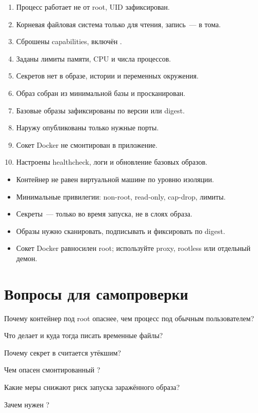 \begin{enumerate}
  \item Процесс работает не от root, UID зафиксирован.
  \item Корневая файловая система только для чтения, запись~--- в тома.
  \item Сброшены capabilities, включён .
  \item Заданы лимиты памяти, CPU и числа процессов.
  \item Секретов нет в образе, истории и переменных окружения.
  \item Образ собран из минимальной базы и просканирован.
  \item Базовые образы зафиксированы по версии или digest.
  \item Наружу опубликованы только нужные порты.
  \item Сокет Docker не смонтирован в приложение.
  \item Настроены healthcheck, логи и обновление базовых образов.
\end{enumerate}

\begin{summarybox}
\begin{itemize}
  \item Контейнер не равен виртуальной машине по уровню изоляции.
  \item Минимальные привилегии: non-root, read-only, cap-drop,
        лимиты.
  \item Секреты~--- только во время запуска, не в слоях образа.
  \item Образы нужно сканировать, подписывать и фиксировать по digest.
  \item Сокет Docker равносилен root; используйте proxy, rootless
        или отдельный демон.
\end{itemize}
\end{summarybox}

\section*{Вопросы для самопроверки}
\begin{selfcheck}
  \item Почему контейнер под root опаснее, чем процесс под обычным
        пользователем?
  \item Что делает  и куда тогда писать временные
        файлы?
  \item Почему секрет в  считается утёкшим?
  \item Чем опасен смонтированный ?
  \item Какие меры снижают риск запуска заражённого образа?
  \item Зачем нужен ?
\end{selfcheck}
